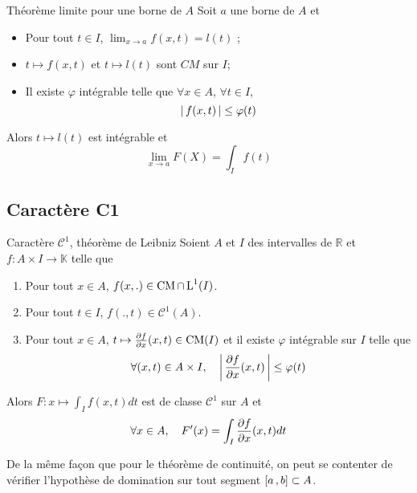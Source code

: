     \begin{prop}{Théorème limite pour une borne de $A$}{}
        Soit $a$ une borne de $A$ et 
        \begin{itemize}
            \item Pour tout $t \in I$, $\lim_{x \to a} f(x,t) = l(t)$ ;
            \item $t \mapsto f(x,t)$ et $t \mapsto l(t)$ sont $CM$ sur $I$;
            \item Il existe $\varphi$ intégrable telle que $\forall x \in A$, $\forall t \in I$, 
            \[ \left\lvert \,f(x,t) \, \right\rvert \leq \varphi(t) \]   
        \end{itemize}
        Alors $t \mapsto l(t)$ est intégrable et 
        \[ \lim_{x \to a} F(X) = \int_I f(t) \]   
    \end{prop}

    \subsection{Caractère C1}

    \begin{theo}{Caractère $\mathcal{C}^1$, théorème de Leibniz}{}
        Soient $A$ et $I$ des intervalles de $\mathbb{R}$ et $f : A \times I \to \mathbb{K}$ telle que 
        \begin{enumerate}[label=$(h_{\alph*})$]
            \item Pour tout $x \in A$, $f(x,.) \in \operatorname{CM} \cap \operatorname{L}^1(I)$.
            \item Pour tout $t \in I$, $f(.,t) \in \mathcal{C}^1(A)$.
            \item Pour tout $x \in A$, $t \mapsto \frac{\partial f}{\partial x}(x,t) \in \operatorname{CM}(I)$ et il existe $\varphi$ intégrable sur $I$ telle que 
            \[ \forall (x,t) \in A \times I, \quad \left\lvert \,\frac{\partial f}{\partial x}(x,t) \, \right\rvert \leq \varphi(t) \]   
        \end{enumerate}
        Alors $F : x \mapsto \int_{I} f(x,t)dt$ est de classe $\mathcal{C}^1$ sur $A$ et 
        \[ \forall x \in A, \quad F'(x) = \int_{I} \frac{\partial f}{\partial x}(x,t)dt \]   
    \end{theo}

    De la même façon que pour le théorème de continuité, on peut se contenter de vérifier l’hypothèse de domination sur tout segment $\left[ a \, , b \right] \subset A$. 

